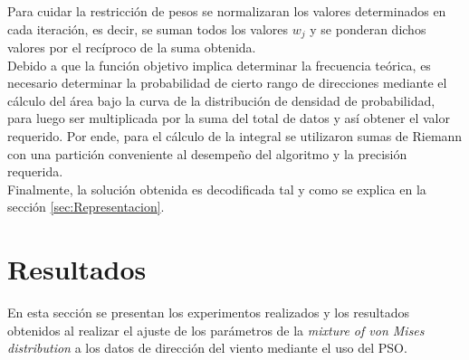 Para cuidar la restricción de pesos se normalizaran los valores determinados en cada iteración, es decir, se suman todos los valores $w_j$ y se ponderan dichos valores por el recíproco de la suma obtenida.\\
Debido a que la función objetivo implica determinar la frecuencia teórica, es necesario determinar la probabilidad
de cierto rango de direcciones mediante el cálculo del área bajo la curva de la distribución de densidad de probabilidad, para luego ser multiplicada por la suma del total de datos y así obtener el valor requerido. Por ende, para el cálculo de la integral se utilizaron sumas de Riemann con una partición conveniente al desempeño del algoritmo y la precisión requerida.\\
Finalmente, la solución obtenida es decodificada tal y como se explica en la sección \ref{sec:Representacion}.\\

\section{Resultados}\label{sec:Resultados_Dir}
En esta sección se presentan los experimentos realizados y los resultados obtenidos al realizar el ajuste de los parámetros de la \emph{mixture of von Mises distribution} a los datos de dirección del viento mediante el uso del PSO.
